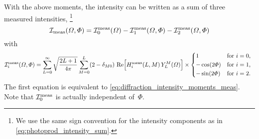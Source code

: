 With the above moments, the intensity can be written as a sum of three
measured intensities, \ie\footnote{We use the same sign convention for
the intensity components as in \cref{eq:photoprod_intensity_sum}.}
\begin{equation}
  \mathcal{I}_\text{meas}(\Omega, \Phi)
  = \mathcal{I}_0^\text{meas}(\Omega) - \mathcal{I}_1^\text{meas}(\Omega, \Phi) - \mathcal{I}_2^\text{meas}(\Omega, \Phi)
\end{equation}
with
\begin{equation}
  \intensity_i^\text{meas}(\Omega, \Phi)
  = \sum_{L = 0}^\infty \sqrt{\frac{2 L + 1}{4 \pi}} \sum_{M = 0}^{L} (2 - \delta_{M 0})\,
  \Re{H_i^\text{meas}(L, M)\, Y_L^M(\Omega)} \times \begin{cases*}
    1             & for $i = 0$, \\
    -\cos(2 \Phi) & for $i = 1$, \\
    -\sin(2 \Phi) & for $i = 2$.
  \end{cases*}
\end{equation}
The first equation is equivalent to
\cref{eq:diffraction_intensity_moments_meas}.  Note that
$\mathcal{I}_0^\text{meas}$ is actually independent of~$\Phi$.

